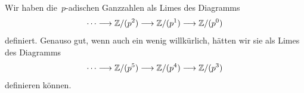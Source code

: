 \begin{bsp}Wir haben die~$p$-adischen Ganzzahlen als Limes des Diagramms
\[ \cdots \longrightarrow \mathbb{Z}/(p^2) \longrightarrow \mathbb{Z}/(p^1) \longrightarrow \mathbb{Z}/(p^0) \]
definiert. Genauso gut, wenn auch ein wenig willkürlich, hätten wir sie als
Limes des Diagramms
\[ \cdots \longrightarrow \mathbb{Z}/(p^5) \longrightarrow \mathbb{Z}/(p^4) \longrightarrow \mathbb{Z}/(p^3) \]
definieren können.\end{bsp}





